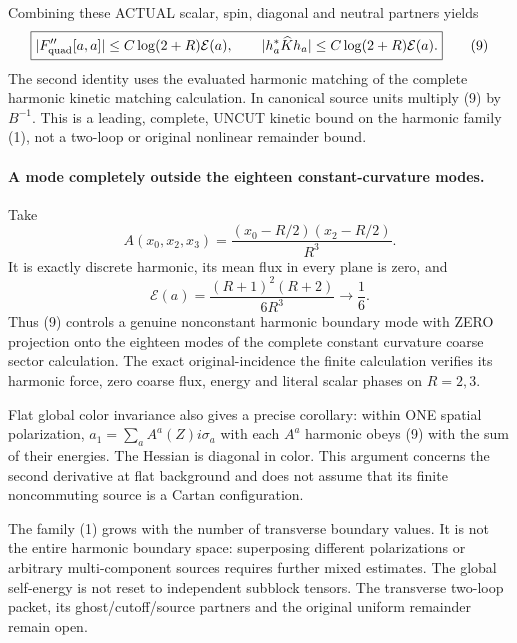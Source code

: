 \documentclass[11pt]{article}
\begin{document}
Combining these ACTUAL scalar, spin, diagonal and neutral partners yields
\[
 \boxed{|F_{\rm quad}''[a,a]|
       \le C\log(2+R)\mathcal E(a),\qquad
       |h_a^*\widehat K h_a|
       \le C\log(2+R)\mathcal E(a).}                            \tag{9}
\]
The second identity uses the evaluated harmonic matching of the complete harmonic kinetic matching calculation.
In canonical source units multiply (9) by $B^{-1}$.
This is a leading, complete, UNCUT kinetic bound on the harmonic family
(1), not a two-loop or original nonlinear remainder bound.

\paragraph{A mode completely outside the eighteen constant-curvature modes.}
Take
\[
 A(x_0,x_2,x_3)=
 \frac{(x_0-R/2)(x_2-R/2)}{R^3}.
\]
It is exactly discrete harmonic, its mean flux in every plane is zero,
and
\[
 \mathcal E(a)=\frac{(R+1)^2(R+2)}{6R^3}\longrightarrow\frac16.
\]
Thus (9) controls a genuine nonconstant harmonic boundary mode with
ZERO projection onto the eighteen modes of the complete constant curvature coarse sector calculation.
The exact original-incidence the finite calculation verifies its harmonic
force, zero coarse flux, energy and literal scalar phases on $R=2,3$.

Flat global color invariance also gives a precise corollary: within
ONE spatial polarization, $a_1=\sum_a A^a(Z)i\sigma_a$ with each $A^a$
harmonic obeys (9) with the sum of their energies. The Hessian is
diagonal in color. This argument concerns the second derivative at
flat background and does not assume that its finite noncommuting
source is a Cartan configuration.

The family (1) grows with the number of transverse boundary values.
It is not the entire harmonic boundary space: superposing different
polarizations or arbitrary multi-component sources requires further mixed
estimates. The global self-energy is not reset to independent subblock
tensors. The transverse two-loop packet, its ghost/cutoff/source partners
and the original uniform remainder remain open.
\end{document}
